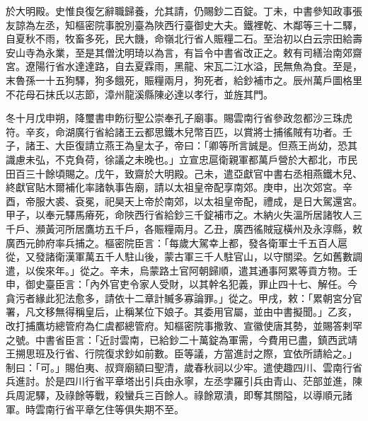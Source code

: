 \begin{pinyinscope}
於大明殿。史惟良復乞辭職歸養，允其請，仍賜鈔二百錠。丁未，中書參知政事張友諒為左丞，知樞密院事脫別臺為陜西行臺御史大夫。鐵裡乾、木鄰等三十二驛，自夏秋不雨，牧畜多死，民大饑，命嶺北行省人賑糧二石。至治初以白云宗田給壽安山寺為永業，至是其僧沈明琦以為言，有旨令中書省改正之。敕有司繕治南郊齋宮。遼陽行省水達達路，自去夏霖雨，黑龍、宋瓦二江水溢，民無魚為食。至是，末魯孫一十五狗驛，狗多餓死，賑糧兩月，狗死者，給鈔補市之。辰州萬戶圖格里不花母石抹氏以志節，漳州龍溪縣陳必達以孝行，並旌其門。



 冬十月戊申朔，降璽書申飭衍聖公崇奉孔子廟事。賜雲南行省參政忽都沙三珠虎符。辛亥，命湖廣行省給諸王云都思鐵木兒幣百匹，以賞將士捕徭賊有功者。壬子，諸王、大臣復請立燕王為皇太子，帝曰：「卿等所言誠是。但燕王尚幼，恐其識慮未弘，不克負荷，徐議之未晚也。」立宣忠扈衛親軍都萬戶營於大都北，市民田百三十餘頃賜之。戊午，致齋於大明殿。己未，遣亞獻官中書右丞相燕鐵木兒、終獻官貼木爾補化率諸執事告廟，請以太祖皇帝配享南郊。庚申，出次郊宮。辛酉，帝服大裘、袞冕，祀昊天上帝於南郊，以太祖皇帝配，禮成，是日大駕還宮。甲子，以奉元驛馬瘠死，命陜西行省給鈔三千錠補市之。木納火失溫所居諸牧人三千戶、瀕黃河所居鷹坊五千戶，各賑糧兩月。乙丑，廣西徭賊寇橫州及永淳縣，敕廣西元帥府率兵捕之。樞密院臣言：「每歲大駕幸上都，發各衛軍士千五百人扈從，又發諸衛漢軍萬五千人駐山後，蒙古軍三千人駐官山，以守關梁。乞如舊數調遣，以俟來年。」從之。辛未，烏蒙路土官阿朝歸順，遣其通事阿累等貢方物。壬申，御史臺臣言：「內外官吏令家人受財，以其幹名犯義，罪止四十七、解任。今貪污者緣此犯法愈多，請依十二章計贓多寡論罪。」從之。甲戌，敕：「累朝宮分官署，凡文移無得稱皇后，止稱某位下娘子。其委用官屬，並由中書擬聞。」乙亥，改打捕鷹坊總管府為仁虞都總管府。知樞密院事撒敦、宣徽使唐其勢，並賜答剌罕之號。中書省臣言：「近討雲南，已給鈔二十萬錠為軍需，今費用已盡，鎮西武靖王搠思班及行省、行院復求鈔如前數。臣等議，方當進討之際，宜依所請給之。」制曰：「可。」賜伯夷、叔齊廟額曰聖清，歲春秋祠以少牢。遣使趣四川、雲南行省兵進討。於是四川行省平章塔出引兵由永寧，左丞孛羅引兵由青山、茫部並進，陳兵周泥驛，及祿餘等戰，殺蠻兵三百餘人。祿餘眾潰，即奪其關隘，以導順元諸軍。時雲南行省平章乞住等俱失期不至。




\end{pinyinscope}
